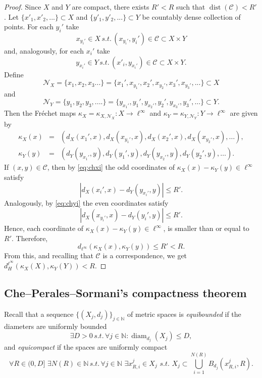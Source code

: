 \documentclass[a4paper,12pt,reqno]{amsart}
\theoremstyle{plain}
\newcommand{\be}{\begin{equation}}
\newcommand{\ee}{\end{equation}}
\newcommand{\dist}{\operatorname{dist}}
\newcommand{\diam}{\operatorname{diam}}
\begin{document}
\begin{proof}
Since $X$ and $Y$ are compact,
there exists $R'<R$ such that 
$\dist(\mathcal C)< R'$.
Let $\{x'_1,x'_2,...\} \subset X$
and $\{y'_1,y'_2,...\} \subset Y$
be countably dense collection of points.
For each $y_i'$ take
\be\label{eq:chxi}
x_{y_i'}\in X \, s.t.\, (x_{y_i'},y_i')\in \mathcal{C}\subset X\times Y 
\ee
and, analogously, for each $x_i'$ take
\be\label{eq:chyi}
y_{x_i'}\in Y \, s.t. \,  (x'_i,y_{x_i'})\in \mathcal{C}\subset X\times Y.
\ee
Define
\[
{\mathcal N}_X=\{x_1,x_2,x_3...\}=\{x_1',x_{y_1'},x_2',x_{y_2'},
x_3',x_{y_3'},...\}\subset X
\]
and 
\[
{\mathcal N}_Y=\{y_1,y_2,y_3,....\}=
\{y_{x_1'},y_1',y_{x_2'}, y_2',
y_{x_3'},y_3',...\}\subset Y.
\]
Then the Fr\'echet maps $\kappa_{X}= \kappa_{X,{\mathcal N}_X}:X\to \ell^\infty$ 
and 
$\kappa_{Y}=\kappa_{Y,{\mathcal N}_Y}:Y\to \ell^\infty$  are given by 
\begin{eqnarray*}
\kappa_X(x)&=&(d_X(x_1',x),d_X(x_{y_1'},x),d_X(x_2',x),
d_X(x_{y_2'},x),\dots),\\
\kappa_Y(y)&=&
(d_Y(y_{x_1'},y),d_Y(y_1',y),
d_Y(y_{x_2'},y), d_Y(y_2',y),\dots).
\end{eqnarray*}
If $(x,y)\in\mathcal{C}$, 
then  by \eqref{eq:chxi} the odd coordinates of 
$\kappa_X(x)-\kappa_Y(y)\in \ell^\infty$ satisfy 
\[
|d_X(x_i',x)-d_Y(y_{x_i'},y)| 
\leq R'.
\]
Analogously, by 
\eqref{eq:chyi} the even coordinates satisfy
\[
|d_X(x_{y_i'},x)-d_Y(y_i',y)|\leq R'.
\]
Hence, each coordinate of 
$\kappa_X(x)-\kappa_Y(y)\in \ell^\infty$, 
is smaller than or equal to $R'$. 
Therefore, 
\[
d_{\ell^\infty}(\kappa_X(x),\kappa_Y(y))\le R'
<R.
\]
From this, and recalling that $\mathcal C$ is a correspondence, we get 
$d_H^{\ell^\infty}(\kappa_X(X),\kappa_Y(Y))<R$.
\end{proof}







\subsection{Che--Perales--Sormani's compactness theorem}\label{sect:p1}
 


Recall that a sequence $\{(X_j,d_j)\}_{j\in\mathbb{N}}$ of metric spaces is \textit{equibounded} if the diameters are uniformly bounded
\be\label{eq:equibounded-B}
\exists D>0 \,s.t.\, \forall j\in\mathbb{N} : \diam_{d_j}(X_j)\le D,
\ee
and \textit{equicompact} if the spaces are uniformly compact
\be\label{eq:equicompact-B}
\forall R\in (0,D]\,
\,\exists N(R) \in \mathbb N \,s.t.\, \forall j\in\mathbb{N}\,\,
\exists x^j_{R,i}\in X_j\,\, s.t.\,\,
X_j\subset \bigcup_{i=1}^{N(R)} B_{d_j}(x^j_{R,i},R).
\ee
\end{document}
